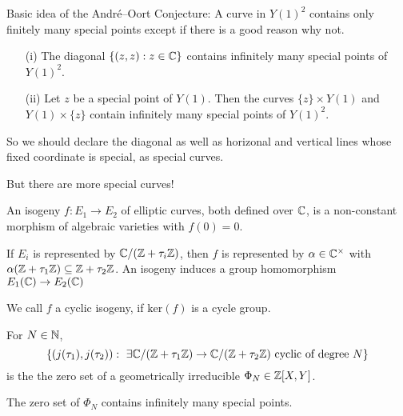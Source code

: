 \documentclass{beamer}
\begin{document}
\begin{frame}
  Basic idea of the Andr\'e--Oort Conjecture: A curve in $Y(1)^2$
  contains only finitely many special points except if there is a good
  reason why not. 

  \begin{example}
    \begin{enumerate}
    \item[(i)] The diagonal  $\{(z,z) : z\in{\mathbb{C}}\}$ contains infinitely
      many special points of $Y(1)^2$. 
    \item [(ii)]  Let $z$ be a special point of $Y(1)$.  Then the curves
      $\{z\}\times Y(1)$ and $Y(1)\times \{z\}$ contain infinitely many
      special points of $Y(1)^2$. 
    \end{enumerate}
  \end{example}

  So we should declare the diagonal as well as horizonal and vertical
  lines whose fixed coordinate is  special, as special curves.

  But there are more special curves!
\end{frame}

\begin{frame}
  \begin{definition}
    An \alert{isogeny} $f\colon E_1\rightarrow E_2$ of elliptic curves, both
    defined over ${\mathbb{C}}$, is a non-constant morphism
    of algebraic varieties with $f(0)=0$. 
  \end{definition}
  
  If $E_i$ is represented by ${\mathbb{C}}/({\mathbb{Z}}+\tau_i{\mathbb{Z}})$,
  then $f$ is represented by $\alpha\in{\mathbb{C}}^\times$ with 
   $\alpha({\mathbb{Z}}+\tau_1{\mathbb{Z}})\subseteq {\mathbb{Z}}+\tau_2{\mathbb{Z}}$. An isogeny induces a \alert{group
   homomorphism} $E_1({\mathbb{C}})\rightarrow E_2({\mathbb{C}})$

  We call $f$ a \alert{cyclic isogeny}, if $\mathrm{ker}(f)$ is a cycle
  group.

  \begin{lemma}
    For $N\in{\mathbb{N}}$, 
    \begin{equation*}
      \left\{ (j(\tau_1),j(\tau_2)) : \text{ 
          $\exists {\mathbb{C}}/({\mathbb{Z}}+\tau_1{\mathbb{Z}})\rightarrow {\mathbb{C}}/({\mathbb{Z}}+\tau_2{\mathbb{Z}})$ cyclic of degree $N$}\right\}
    \end{equation*}
    is the
    the zero set of a geometrically irreducible $\Phi_N\in{\mathbb{Z}}[X,Y]$.
  \end{lemma}

  The zero set of $\Phi_N$ contains infinitely many special points. 
\end{frame}
\end{document}
